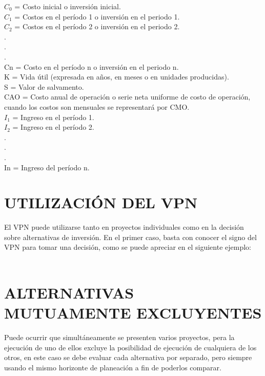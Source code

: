 $C_{0}$  =  Costo inicial o inversión inicial.\\
$C_{1}$ =  Costos en el período 1 o inversión en el periodo 1.\\
$C_{2}$  =  Costos en el período 2 o inversión en el periodo 2.\\
.\\
.\\
.\\
Cn  =  Costo en el período n o inversión en el periodo n.\\
K  =  Vida útil (expresada en años, en meses o en unidades producidas).\\
S  =  Valor de salvamento.\\
CAO  =  Costo anual de operación o serie neta uniforme de costo de operación, cuando los costos son mensuales se representará por CMO.\\
$I_{1}$  =  Ingreso en el período 1.\\
$I_{2}$  =  Ingreso en el período 2.\\
.\\
.\\
.\\
In  =  Ingreso del período n.\\

\section{UTILIZACIÓN DEL VPN}

El VPN puede utilizarse tanto en proyectos individuales como en la decisión sobre alternativas de inversión. En el primer caso, basta con conocer el signo del VPN para tomar una decisión, como se puede apreciar en el siguiente ejemplo:\\
\\


\section{ALTERNATIVAS MUTUAMENTE EXCLUYENTES}

Puede ocurrir que simultáneamente se presenten varios proyectos, pera la ejecución de uno de ellos excluye la posibilidad de ejecución de cualquiera de los otros, en este caso se debe evaluar cada alternativa por separado, pero siempre usando el mismo horizonte de planeación a fin de poderlos comparar.\\
\\


